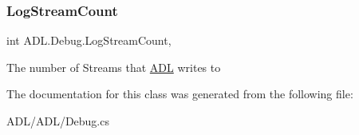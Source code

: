 \subsubsection{\texorpdfstring{Log\+Stream\+Count}{LogStreamCount}}
{\footnotesize\ttfamily int A\+D\+L.\+Debug.\+Log\+Stream\+Count\hspace{0.3cm}{\ttfamily [static]}, {\ttfamily [get]}}



The number of Streams that \mbox{\hyperlink{namespace_a_d_l}{A\+DL}} writes to 



The documentation for this class was generated from the following file\+:\begin{DoxyCompactItemize}
\item 
A\+D\+L/\+A\+D\+L/Debug.\+cs\end{DoxyCompactItemize}
